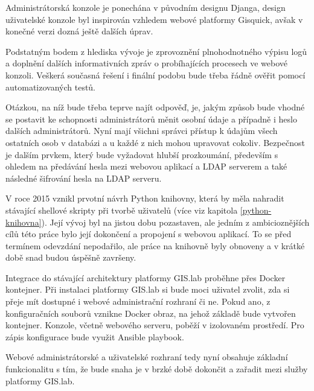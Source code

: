 Administrátorská konzole je ponechána v původním designu Djanga, design uživatelské konzole byl inspirován vzhledem webové platformy Gisquick, avšak v konečné verzi dozná ještě dalších úprav.

Podstatným bodem z hlediska vývoje je zprovoznění plnohodnotného výpisu logů a doplnění dalších informativních zpráv o probíhajících procesech ve webové konzoli. Veškerá současná řešení i finální podobu bude třeba řádně ověřit pomocí automatizovaných testů.

Otázkou, na níž bude třeba teprve najít odpověď, je, jakým způsob bude vhodné se postavit ke schopnosti administrátorů měnit osobní údaje a případně i heslo dalších administrátorů. Nyní mají všichni správci přístup k údajům všech ostatních osob v databázi a u každé z nich mohou upravovat cokoliv. Bezpečnost je dalším prvkem, který bude vyžadovat hlubší prozkoumání, především s ohledem na předávání hesla mezi webovou aplikací a LDAP serverem a také následné šifrování hesla na LDAP serveru. 

V roce 2015 vznikl prvotní návrh Python knihovny, která by měla nahradit stávající shellové skripty při tvorbě uživatelů (více viz kapitola \ref{python-knihovna}). Její vývoj byl na jistou dobu pozastaven, ale jedním z ambicioznějších cílů této práce bylo její dokončení a propojení s webovou aplikací. To se před termínem odevzdání nepodařilo, ale práce na knihovně byly obnoveny a v krátké době snad budou úspěšně završeny.

Integrace do stávající architektury platformy GIS.lab proběhne přes Docker kontejner. Při instalaci platformy GIS.lab si bude moci uživatel zvolit, zda si přeje mít dostupné i webové administrační rozhraní či ne. Pokud ano, z konfiguračních souborů vznikne Docker obraz, na jehož základě bude vytvořen kontejner. Konzole, včetně webového serveru, poběží v izolovaném prostředí. Pro zápis konfigurace bude využit Ansible playbook.

Webové administrátorské a uživatelské rozhraní tedy nyní obsahuje základní funkcionalitu s tím, že bude snaha je v brzké době dokončit a zařadit mezi služby platformy GIS.lab.